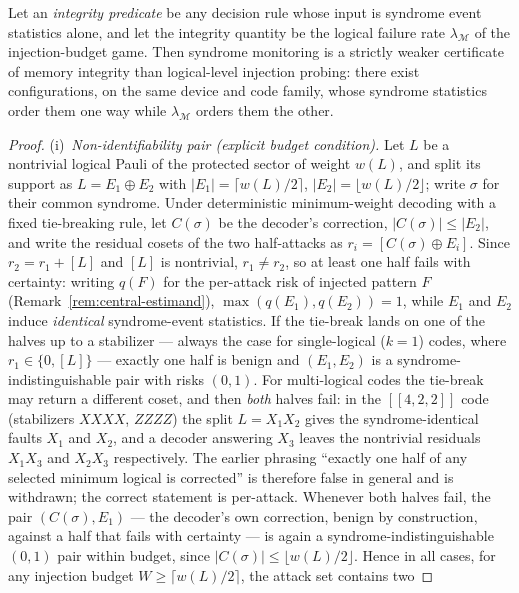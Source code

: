 \documentclass[11pt,a4paper]{article}
\begin{document}
\begin{proposition}\label{prop:syndrome-insufficient}
Let an \emph{integrity predicate} be any decision rule whose input is
syndrome event statistics alone, and let the integrity quantity be the
logical failure rate $\lambda_{\mathcal{M}}$ of the injection-budget
game. Then syndrome monitoring is a strictly weaker certificate of
memory integrity than logical-level injection probing: there exist
configurations, on the same device and code family, whose syndrome
statistics order them one way while $\lambda_{\mathcal{M}}$ orders
them the other.
\end{proposition}
\begin{proof}
(i)~\emph{Non-identifiability pair (explicit budget condition).}
Let $L$ be a nontrivial logical Pauli of the protected sector of weight
$w(L)$, and split its support as $L=E_1\oplus E_2$ with
$|E_1|=\lceil w(L)/2\rceil$, $|E_2|=\lfloor w(L)/2\rfloor$; write
$\sigma$ for their common syndrome. Under deterministic minimum-weight
decoding with a fixed tie-breaking rule, let $C(\sigma)$ be the
decoder's correction, $|C(\sigma)|\le|E_2|$, and write the residual
cosets of the two half-attacks as $r_i=[C(\sigma)\oplus E_i]$. Since
$r_2=r_1+[L]$ and $[L]$ is nontrivial, $r_1\ne r_2$, so at least one
half fails with certainty: writing $q(F)$ for the per-attack risk of
injected pattern $F$ (Remark~\ref{rem:central-estimand}),
$\max(q(E_1),q(E_2))=1$, while $E_1$ and $E_2$ induce \emph{identical}
syndrome-event statistics. If the tie-break lands on one of the halves
up to a stabilizer --- always the case for single-logical ($k=1$)
codes, where $r_1\in\{0,[L]\}$ --- exactly one half is benign and
$(E_1,E_2)$ is a syndrome-indistinguishable pair with risks $(0,1)$.
For multi-logical codes the tie-break may return a different coset, and
then \emph{both} halves fail: in the $[[4,2,2]]$ code (stabilizers
$XXXX$, $ZZZZ$) the split $L=X_1X_2$ gives the syndrome-identical
faults $X_1$ and $X_2$, and a decoder answering $X_3$ leaves the
nontrivial residuals $X_1X_3$ and $X_2X_3$ respectively. The earlier
phrasing ``exactly one half of any selected minimum logical is
corrected'' is therefore false in general and is withdrawn; the correct
statement is per-attack. Whenever both halves fail, the pair
$(C(\sigma),E_1)$ --- the decoder's own correction, benign by
construction, against a half that fails with certainty --- is again a
syndrome-indistinguishable $(0,1)$ pair within budget, since
$|C(\sigma)|\le\lfloor w(L)/2\rfloor$. Hence in all cases, for any
injection budget $W\ge\lceil w(L)/2\rceil$, the attack set contains two

\end{proof}
\end{document}
